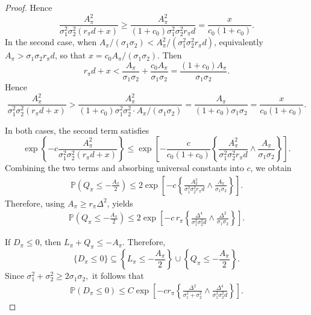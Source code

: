 \documentclass[10pt]{article}
\begin{document}
\begin{proof}
Hence
\begin{equation*}
    \frac{A_\pi^2}{\sigma_1^2\sigma_2^2(r_\pi d + x)} \ge \frac{A_\pi^2}{(1+c_0)\sigma_1^2\sigma_2^2 r_\pi d} = \frac{x}{c_0(1+c_0)}.
\end{equation*}
In the second case, when $A_\pi/(\sigma_1\sigma_2) < A_\pi^2/(\sigma_1^2\sigma_2^2 r_\pi d)$, equivalently $A_\pi > \sigma_1\sigma_2 r_\pi d$, so that $x = c_0 A_\pi/(\sigma_1\sigma_2)$. Then
\begin{equation*}
    r_\pi d + x < \frac{A_\pi}{\sigma_1\sigma_2} + \frac{c_0 A_\pi}{\sigma_1\sigma_2} = \frac{(1+c_0)A_\pi}{\sigma_1\sigma_2}.
\end{equation*}
Hence
\begin{equation*}
    \frac{A_\pi^2}{\sigma_1^2\sigma_2^2(r_\pi d+x)} > \frac{A_\pi^2}{(1+c_0)\sigma_1^2\sigma_2^2 \cdot A_\pi/(\sigma_1\sigma_2)} = \frac{A_\pi}{(1+c_0)\sigma_1\sigma_2} = \frac{x}{c_0(1+c_0)}.
\end{equation*}

\medskip
In both cases, the second term satisfies
\begin{equation*}
    \exp\left\{-c\frac{A_\pi^2}{\sigma_1^2\sigma_2^2(r_\pi d+x)}\right\} \le \exp\left[-\frac{c}{c_0(1+c_0)}\left\{\frac{A_\pi^2}{\sigma_1^2\sigma_2^2 r_\pi d}\wedge \frac{A_\pi}{\sigma_1\sigma_2}\right\}\right].
\end{equation*}
Combining the two terms and absorbing universal constants into $c$, we obtain
\begin{align}
    \mathbb{P}\!\left(Q_\pi \le -\frac{A_\pi}{2}\right) \le 2\exp\left[-c\left\{\frac{A_\pi^2}{\sigma_1^2\sigma_2^2 r_\pi d} \wedge \frac{A_\pi}{\sigma_1\sigma_2}\right\}\right]. \label{eq:intermediate}
\end{align}
Therefore, using $A_\pi \ge r_\pi\Delta^2$, yields
\begin{align}
    \mathbb{P}\!\left(Q_\pi \le -\frac{A_\pi}{2}\right) \le 2\exp\left[-c\, r_\pi\left\{\frac{\Delta^4}{\sigma_1^2\sigma_2^2 d} \wedge \frac{\Delta^2}{\sigma_1\sigma_2}\right\}\right].
\end{align}

If $D_\pi\le0$, then $L_\pi+Q_\pi\le-A_\pi$. Therefore, 
\[ 
\{D_\pi\le0\} \subseteq \left\{ L_\pi\le-\frac{A_\pi}{2} \right\} \cup \left\{ Q_\pi\le-\frac{A_\pi}{2} \right\}. 
\] 
Since $\sigma_1^2+\sigma_2^2 \ge 2\sigma_1\sigma_2,$ it follows that \begin{align} 
\mathbb P(D_\pi\le0) \le C\exp\left[ -cr_\pi \left\{ \frac{\Delta^2}{\sigma_1^2+\sigma_2^2} \wedge \frac{\Delta^4} {\sigma_1^2\sigma_2^2d} \right\} \right]. 
\end{align}


\end{proof}
\end{document}
